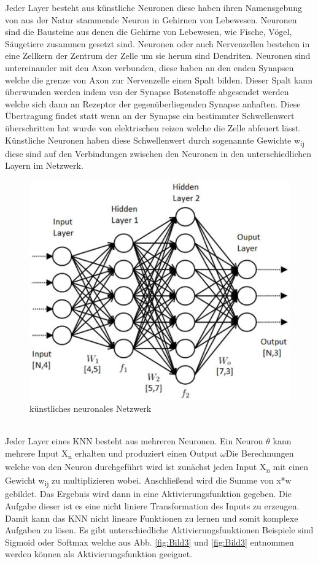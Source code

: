 \documentclass{llncs}
\begin{document}
Jeder Layer besteht aus künstliche Neuronen diese haben ihren Namensgebung von aus der Natur stammende Neuron in Gehirnen von Lebewesen. Neuronen sind die Bausteine aus denen die Gehirne von Lebewesen, wie Fische, Vögel, Säugetiere zusammen gesetzt sind. Neuronen oder auch Nervenzellen bestehen in eine Zellkern der Zentrum der Zelle um sie herum sind Dendriten. Neuronen sind untereinander mit den Axon verbunden, diese haben an den enden Synapsen welche die grenze von Axon zur Nervenzelle einen Spalt bilden. Dieser Spalt kann überwunden werden indem von der Synapse Botenstoffe abgesendet werden welche sich dann an Rezeptor der gegenüberliegenden Synapse anhaften. Diese Übertragung findet statt wenn an der Synapse ein bestimmter Schwellenwert überschritten hat wurde von elektrischen reizen welche die Zelle abfeuert lässt. Künstliche Neuronen haben diese Schwellenwert durch sogenannte Gewichte w\textsubscript{ij} diese sind auf den Verbindungen zwischen den Neuronen in den unterschiedlichen Layern im Netzwerk.
\begin{figure}[htbp] 
	\centering
	\includegraphics[width=1.0\textwidth]{neuronalesnetzwerk.jpg}
	\caption{künstliches neuronales Netzwerk}
	\label{fig:Bild2}
\end{figure}
\\
Jeder Layer eines KNN besteht aus mehreren Neuronen. Ein Neuron $\theta$ kann mehrere Input X\textsubscript{n} erhalten und produziert einen Output $\omega$\. Die Berechnungen welche von den Neuron durchgeführt wird ist zunächst jeden Input X\textsubscript{n} mit einen Gewicht w\textsubscript{ij} zu multiplizieren wobei. Anschließend wird die Summe von x*w gebildet. Das Ergebnis wird dann in eine Aktivierungsfunktion gegeben. Die Aufgabe dieser ist es eine nicht liniere Transformation des Inputs zu erzeugen. Damit kann das KNN nicht lineare Funktionen zu lernen und somit komplexe Aufgaben zu lösen. Es gibt unterschiedliche Aktivierungsfunktionen Beispiele sind Sigmoid oder Softmax welche aus Abb. \ref{fig:Bild3} und \ref{fig:Bild3} entnommen werden können als Aktivierungsfunktion geeignet. 
\end{document}
